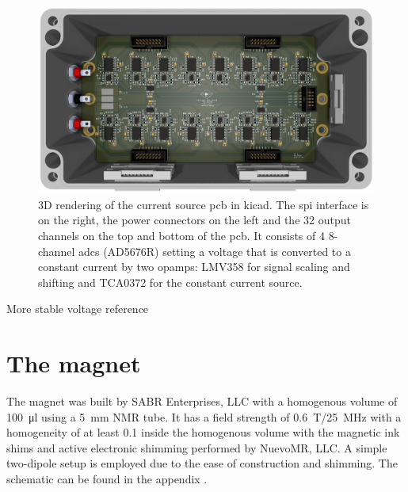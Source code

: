 \begin{figure}[hbt]
    \centering
    
    \caption{ }
\end{figure}


\begin{figure}[hbt]
    \centering
    \includegraphics[width=\textwidth]{images/32-channel_current_source.png}
    \caption{ 3D rendering of the current source \acrshort{pcb} in \gls{kicad}. The \acrshort{spi} interface is on the right, the power connectors on the left and the 32 output channels on the top and bottom of the \acrshort{pcb}. It consists of 4 8-channel \acrshort{adc}s (AD5676R) setting a voltage that is converted to a constant current by two \acrshort{opamp}s: LMV358 for signal scaling and shifting and TCA0372 for the constant current source.}
\end{figure}

More stable voltage reference

\begin{figure}[hbt]
    \centering
    
    \caption{ }
\end{figure}

\section{The magnet}
The magnet was built by SABR Enterprises, LLC with a homogenous volume of \qty{100}{\micro\litre} using a \qty{5}{\milli\metre} NMR tube. It has a field strength of \qty{0.6}{\tesla}/\qty{25}{\mega\hertz} with a homogeneity of at least \qty{0.1}{\partspermillion} inside the homogenous volume with the magnetic ink shims and active electronic shimming performed by NuevoMR, LLC. A simple two-dipole setup is employed due to the ease of construction and shimming. The schematic can be found in the appendix .

